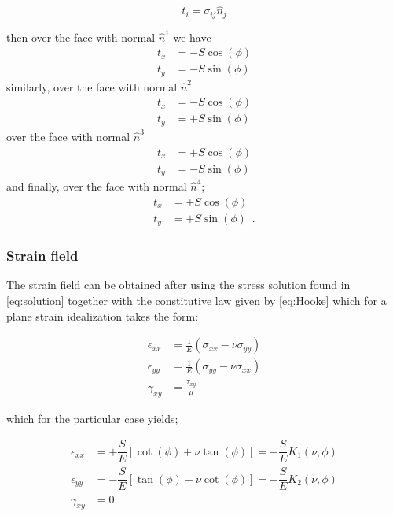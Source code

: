 \[t_{i} = \sigma_{ij}\hat{n}_{j}\]

then over the face with normal $\hat{n}^1$ we have
\begin{align*}
t_{x} &= -S\cos(\phi)\\
t_{y} &= -S\sin(\phi)
\end{align*}
similarly, over the face with normal $\hat{n}^2$
\begin{align*}
t_{x} &= -S\cos(\phi)\\
t_{y} &= +S\sin(\phi)
\end{align*}
over the face with normal $\hat{n}^3$ 
\begin{align*}
t_{x} &= +S\cos(\phi)\\
t_{y} &= -S\sin(\phi)
\end{align*}
and finally, over the face with normal $\hat{n}^4$;
\begin{align*}
t_{x} &= +S\cos(\phi)\\
t_{y} &= +S\sin(\phi) \enspace .
\end{align*}

\subsubsection*{Strain field}
The strain field can be obtained after using the stress solution found in \cref{eq:solution} together with the constitutive law given by \cref{eq:Hooke} which for a plane strain idealization takes the form:

\begin{equation}
\begin{aligned}
\epsilon_{xx}& = \frac{1}{E}(\sigma_{xx} - \nu \sigma_{yy}) \\
\epsilon_{yy}& = \frac{1}{E}(\sigma_{yy} - \nu \sigma_{xx}) \\
\gamma_{xy}& = \frac{\tau _{xy}}{\mu}
\end{aligned}
\label{eq:cons model}
\end{equation}

which for the particular case yields;


\begin{equation}
\begin{aligned}
\epsilon_{xx}& = +\dfrac{S}{E}\left[\cot(\phi)+\nu \tan(\phi)\right] = +\dfrac{S}{E}K_{1}(\nu , \phi)\\
\epsilon_{yy}& = -\dfrac{S}{E}\left[\tan(\phi)+\nu \cot(\phi)\right] = -\dfrac{S}{E}K_{2}(\nu , \phi)\\
\gamma_{xy}& = 0.
\end{aligned}
\label{eq:strain part}
\end{equation}

